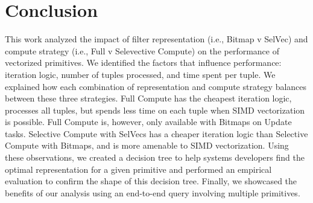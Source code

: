 \documentclass[12pt]{cmuthesis}
\begin{document}
\chapter{Conclusion}
This work analyzed the impact of filter representation (i.e., Bitmap v SelVec) and compute strategy (i.e., Full v Selevective Compute) on the performance of vectorized primitives. We identified the factors that influence performance: iteration logic, number of tuples processed, and time spent per tuple. We explained how each combination of representation and compute strategy balances between these three strategies. Full Compute has the cheapest iteration logic, processes all tuples, but spends less time on each tuple when SIMD vectorization is possible. Full Compute is, however, only available with Bitmaps on Update tasks. Selective Compute with SelVecs has a cheaper iteration logic than Selective Compute with Bitmaps, and is more amenable to SIMD vectorization. Using these observations, we created a decision tree to help systems developers find the optimal representation for a given primitive and performed an empirical evaluation to confirm the shape of this decision tree. Finally, we showcased the benefits of our analysis using an end-to-end query involving multiple primitives.

%

\backmatter


\renewcommand{\bibsection}{\chapter{\bibname}}

\end{document}
